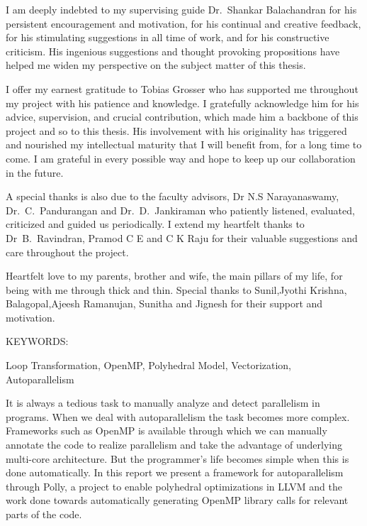 \documentclass[MTech]{iitmdiss}
\begin{document}
I am deeply indebted to my supervising guide Dr.~Shankar Balachandran
for his persistent encouragement and motivation, for his continual and
creative feedback, for his stimulating suggestions in all time of work,
and for his constructive criticism. His ingenious suggestions and thought
provoking propositions have helped me widen my perspective on the subject
matter of this thesis.
 
I offer my earnest gratitude to Tobias Grosser who has supported me throughout
my project with his patience and knowledge. I gratefully acknowledge him for his advice,
supervision, and crucial contribution, which made him a backbone of this project
and so to this thesis. His involvement with his originality has triggered and
nourished my intellectual maturity that I will benefit from, for a long time to come. 
I am grateful in every possible way and hope to keep up our collaboration in the future.

A special thanks is also due to the faculty advisors, Dr N.S Narayanaswamy, Dr.~C.~Pandurangan
and Dr.~D.~Jankiraman who patiently listened, evaluated, criticized and guided us periodically.
I extend my heartfelt thanks to Dr~B.~Ravindran, Pramod C E and C K Raju for
their valuable suggestions and care throughout the project.

Heartfelt love to my parents, brother and wife, the main pillars of my life, for being with me through thick and thin.
Special thanks to Sunil,Jyothi Krishna, Balagopal,Ajeesh Ramanujan, Sunitha and Jignesh for their support and motivation.


\abstract

\noindent KEYWORDS: \hspace*{0.5em} \parbox[t]{4.4in}{Loop Transformation,
OpenMP, Polyhedral Model, Vectorization, Autoparallelism}

\vspace*{24pt}

It is always a tedious task to manually analyze and detect parallelism in programs. When
we deal with autoparallelism the task becomes more complex. Frameworks such as OpenMP
is available through which we can manually annotate the code to realize parallelism and take the
advantage of underlying multi-core architecture. But the programmer's life becomes simple
when this is done automatically. In this report we present a framework for autoparallelism through Polly,
a project to enable polyhedral optimizations in LLVM and the work done
towards automatically generating OpenMP library calls for relevant parts of the code.
\end{document}
